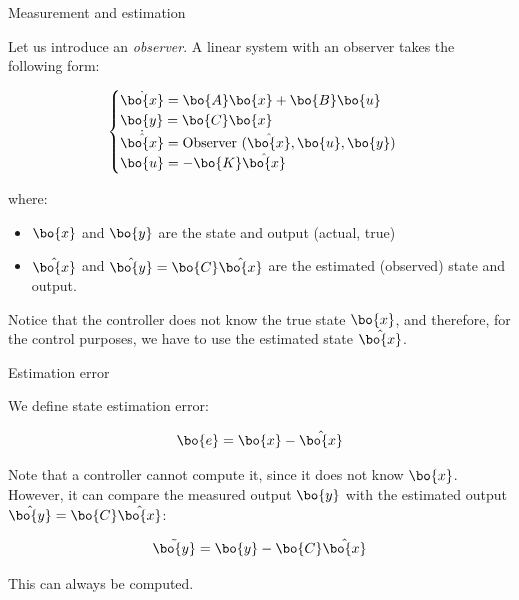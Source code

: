 \documentclass{beamer}
\begin{document}
\begin{frame}{Measurement and estimation}
\begin{flushleft}

Let us introduce an \emph{observer}. A linear system with an observer takes the following form:

\begin{equation}
\begin{cases}
\dot {\bo{x}} = \bo{A} \bo{x} + \bo{B} \bo{u} \\
\bo{y} = \bo{C} \bo{x} \\
\dot{\hat{\bo{x}}} = \text{Observer} \ (\hat{\bo{x}}, \bo{u}, \bo{y}) \\
\bo{u} = -\bo{K}\hat{\bo{x}}
\end{cases}
\end{equation}

where:

\begin{itemize}
\item $\bo{x}$ and $\bo{y}$ are the state and output (actual, true)
\item $\hat{\bo{x}}$ and $\hat{\bo{y}} =\bo{C} \hat{\bo{x}}$ are the estimated (observed) state
and output.
\end{itemize}

Notice that the controller does not know the true state $\bo{x}$, and therefore, for the control purposes, we have to use the estimated state $\hat{\bo{x}}$.

\end{flushleft}
\end{frame}




\begin{frame}{Estimation error}
	\begin{flushleft}
		
		We define state estimation error:
		
		\begin{equation}
		\bo{e} = \bo{x} - \hat{\bo{x}}
		\end{equation}
		
		Note that a controller cannot compute it, since it does not know $\bo{x}$. However, it can compare the measured output $\bo{y}$ with the estimated output $\hat{\bo{y}} =\bo{C} \hat{\bo{x}}$:
		
		\begin{equation}
		\Tilde{\bo{y}} = \bo{y} -  \bo{C} \hat{\bo{x}}  
		\end{equation}		
		
		This can always be computed.
		
	\end{flushleft}
\end{frame}
\end{document}
